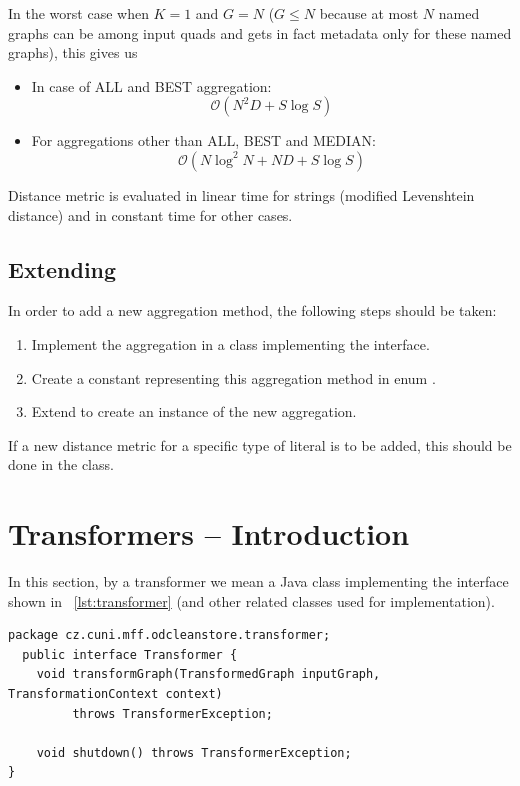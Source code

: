 In the worst case when $K = 1$ and $G = N$ ($G\leq N$ because at most $N$ named graphs can be among input quads and \CR gets in fact metadata only for these named graphs), this gives us

\begin{itemize}
	\item In case of ALL and BEST aggregation:
		$$ \mathcal{O}\left(N^2 D+S\log S\right)$$
	\item For aggregations other than ALL, BEST and MEDIAN:
	$$ \mathcal{O}\left( N \log^2 N + ND+S\log S \right)$$
\end{itemize}

Distance metric is evaluated in linear time for strings (modified Levenshtein distance) and in constant time for other cases.

\section{Extending}
In order to add a new aggregation method, the following steps should be taken:
\begin{enumerate}
	\item Implement the aggregation in a class implementing the  interface.
	\item Create a constant representing this aggregation method in enum .
	\item Extend  to create an instance of the new aggregation.
\end{enumerate}

If a new distance metric for a specific type of literal is to be added, this should be done in the  class.


\chapter{Transformers -- Introduction}
In this section, by a transformer we mean a Java class implementing the  interface shown in \lstlistingname~\ref{lst:transformer} (and other related classes used for implementation).

\begin{lstlisting}[caption={Transformer interface},label=lst:transformer]
  package cz.cuni.mff.odcleanstore.transformer;
  public interface Transformer {
    void transformGraph(TransformedGraph inputGraph, TransformationContext context)
         throws TransformerException;

    void shutdown() throws TransformerException;
}
\end{lstlisting}

